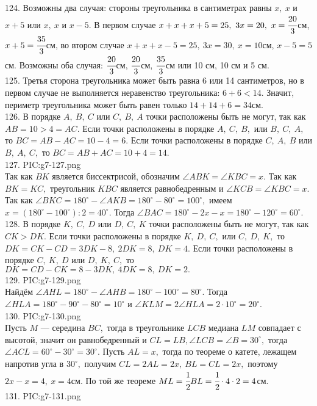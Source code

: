 124. Возможны два случая: стороны треугольника в сантиметрах равны $x,\ x$ и $x+5$ или $x,\ x$ и $x-5.$ В первом случае $x+x+x+5=25,\ 3x=20,\ x=\cfrac{20}{3}$см, $x+5=\cfrac{35}{3}$см, во втором случае $x+x+x-5=25,\ 3x=30,\ x=10$см, $x-5=5$см. Возможны оба случая: $\cfrac{20}{3}$см, $\cfrac{20}{3}$см, $\cfrac{35}{3}$см или 10 см, 10 см и 5 см.\\
125. Третья сторона треугольника может быть равна 6 или 14 сантиметров, но в первом случае не выполняется неравенство треугольника: $6+6<14.$ Значит, периметр треугольника может быть равен только $14+14+6=34$см.\\
126. В порядке $A,\ B,\ C$ или $C,\ B,\ A$ точки расположены быть не могут, так как $AB=10>4=AC.$ Если точки расположены в порядке $A,\ C,\ B,$ или $B,\ C,\ A,$ то $BC=AB-AC=10-4=6.$ Если точки расположены в порядке $C,\ A,\ B$ или $B,\ A,\ C,$ то $BC=AB+AC=10+4=14.$\\
127. {{PIC:g7-127.png}}\\
Так как $BK$ является биссектрисой, обозначим $\angle ABK=\angle KBC=x.$ Так как $BK=KC,$ треугольник $KBC$ является равнобедренным и $\angle KCB=\angle KBC=x.$ Так как $\angle BKC=180^\circ-\angle AKB=180^\circ-80^\circ=100^\circ,$ имеем $x=(180^\circ-100^\circ):2=40^\circ.$ Тогда $\angle BAC=180^\circ-2x-x=180^\circ-120^\circ=60^\circ.$\\
128. В порядке $K,\ C,\ D$ или $D,\ C,\ K$ точки расположены быть не могут, так как $CK>DK.$ Если точки расположены в порядке $K,\ D,\ C,$ или $C,\ D,\ K,$ то $DK=CK-CD=3DK-8,\ 2DK=8,\ DK=4.$ Если точки расположены в порядке $C,\ K,\ D$ или $D,\ K,\ C,$ то $DK=CD-CK=8-3DK,\ 4DK=8,\ DK=2.$\\
129. {{PIC:g7-129.png}}\\
Найдём $\angle AHL=180^\circ-\angle AHB=180^\circ-100^\circ=80^\circ.$ Тогда $\angle HLA=180^\circ-90^\circ-80^\circ=10^\circ$ и $\angle KLM=2\angle HLA=2\cdot10^\circ=20^\circ.$\\
130. {{PIC:g7-130.png}}\\
Пусть $M$ --- середина $BC,$ тогда в треугольнике $LCB$ медиана $LM$ совпадает с высотой, значит он равнобедренный и  $CL=LB, \angle LCB=\angle B=30^\circ,$ тогда $\angle ACL=60^\circ-30^\circ=30^\circ.$ Пусть $AL=x,$ тогда по теореме о катете, лежащем напротив угла в $30^\circ,$ получим $CL=2AL=2x,\ BL=CL=2x,$ поэтому $2x-x=4,\ x=4$см. По той же теореме $ML=\cfrac{1}{2}BL=\cfrac{1}{2}\cdot4\cdot2=4$см.\\
131. {{PIC:g7-131.png}}\\
